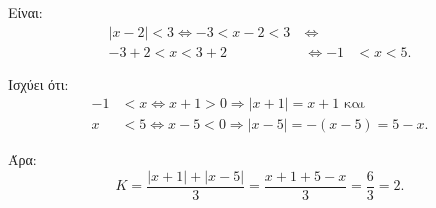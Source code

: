
\begin{alist}
\item Είναι:
\begin{align*}
|x - 2| < 3 \Leftrightarrow -3 < x - 2 < 3 \ &\Leftrightarrow \\
-3 + 2 < x < 3 + 2 \ &\Leftrightarrow -1 &< x < 5.
\end{align*}

\item Ισχύει ότι:
\begin{align*}
-1 &< x \Leftrightarrow x + 1 > 0 \Rightarrow |x + 1| = x + 1\text{ και} \\
x &< 5 \Leftrightarrow x - 5 < 0 \Rightarrow |x - 5| = -(x - 5) = 5 - x.
\end{align*}

Άρα:
\[K = \dfrac{|x + 1| + |x - 5|}{3} = \dfrac{x + 1 + 5 - x}{3} = \dfrac{6}{3} = 2.\]
\end{alist}

